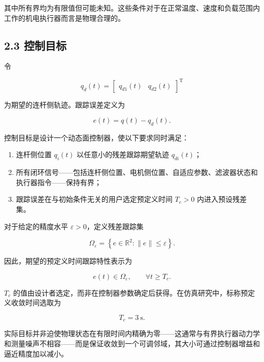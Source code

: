 \documentclass{article}
\begin{document}
其中所有界均为有限值但可能未知。这些条件对于在正常温度、速度和负载范围内工作的机电执行器而言是物理合理的。

\subsection{2.3 控制目标}

令

\begin{equation*}
q_d(t)=\begin{bmatrix}q_{d1}(t) & q_{d2}(t)\end{bmatrix}^{\mathrm T}
\end{equation*}

为期望的连杆侧轨迹。跟踪误差定义为

\begin{equation}
e(t)=q(t)-q_d(t). \tag{13}
\end{equation}

控制目标是设计一个动态面控制器，使以下要求同时满足：

\begin{enumerate}
\item 连杆侧位置 $q_i(t)$ 以任意小的残差跟踪期望轨迹 $q_{di}(t)$；
\item 所有闭环信号——包括连杆侧位置、电机侧位置、自适应参数、滤波器状态和执行器指令——保持有界；
\item 跟踪误差在与初始条件无关的用户选定预定义时间 $T_c>0$ 内进入预设残差集。
\end{enumerate}

对于给定的精度水平 $\varepsilon>0$，定义残差跟踪集

\begin{equation}
\Omega_\varepsilon=\left\{e\in\mathbb{R}^{2}:\|e\|\leq\varepsilon\right\}. \tag{14}
\end{equation}

因此，期望的预定义时间跟踪特性表示为

\begin{equation}
e(t)\in\Omega_\varepsilon,\qquad \forall t\geq T_c. \tag{15}
\end{equation}

$T_c$ 的值由设计者选定，而非在控制器参数确定后获得。在仿真研究中，标称预定义收敛时间选取为

\begin{equation*}
T_c=3~\mathrm{s}.
\end{equation*}

实际目标并非迫使物理状态在有限时间内精确为零——这通常与有界执行器动力学和测量噪声不相容——而是保证收敛到一个可调邻域，其大小可通过控制器增益和逼近精度加以减小。
\end{document}
